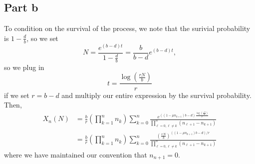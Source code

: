 \documentclass{article}
\begin{document}
\subsection{Part b}
To condition on the survival of the process, we note that the surivial probability is $1-\frac{d}{b}$, so we set
\[
N=\frac{e^{(b-d)t}}{1-\frac{d}{b}}=\frac{b}{b-d}e^{(b-d)t},
\]
so we plug in 
\[
t=\frac{\log\left(\frac{rN}{b}\right)}{r}
\]
if we set $r=b-d$ and multiply our entire expression by the survival probability. Then,
\begin{align*}
X_n(N)&=\frac{b}{r}\left(\prod_{k=1}^{n}n_k\right)\sum_{k=0}^{n}\frac{e^{((1-\mu n_{k+1})b-d) \frac{\log\left(\frac{rN}{b}\right)}{r}}}{\prod_{\ell=0,\ell\neq k}^{n}(n_{\ell+1}-n_{k+1})}\\&=
\frac{b}{r}\left(\prod_{k=1}^{n}n_k\right)\sum_{k=0}^{n}\frac{\left(\frac{rN}{b}\right)^{((1-\mu n_{k+1})b-d)/r}}{\prod_{\ell=0,\ell\neq k}^{n}(n_{\ell+1}-n_{k+1})}
\end{align*}
where we have maintained our convention that $n_{n+1}=0$.
\end{document}
